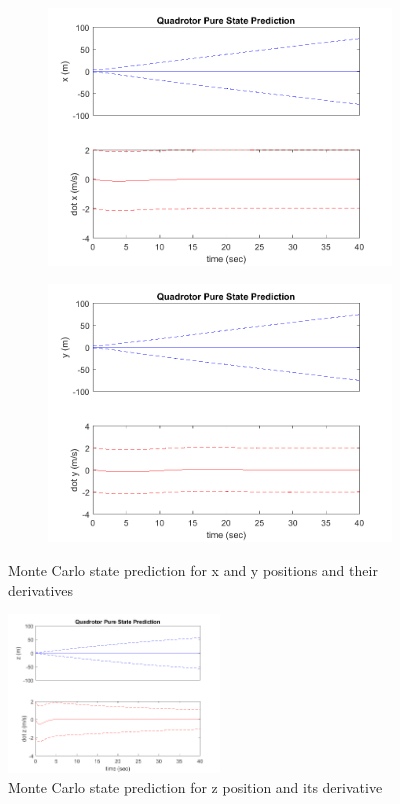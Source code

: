 \documentclass[12pt]{extarticle}
\begin{document}
{{\begin{figure}[h!]
    \centering
    \begin{subfigure}[b]{0.49\textwidth}
        \centering
        \includegraphics[width=\textwidth]{Images/MCx.png}
    \end{subfigure}
    \begin{subfigure}[b]{0.49\textwidth}
        \centering
        \includegraphics[width=\textwidth]{Images/MCy.png}
    \end{subfigure}
     \caption{Monte Carlo state prediction for x and y positions and their derivatives}
    \label{Mcxy}   
\end{figure}


\begin{figure}[h!]
        \centering
        \includegraphics[width=0.5\textwidth]{Images/MCz.png}
    \caption{Monte Carlo state prediction for z position and its derivative}
    \label{Mcz}
\end{figure}
}
}
\newpage
\end{document}

